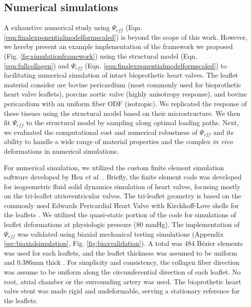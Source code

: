 \subsection{Numerical simulations}

	A exhaustive numerical study using $\Psi_{eff}$ (Eqn. \ref{eqn:finalexponentialmodelformscaled}) is beyond the scope of this work. However, we hereby present an example implementation of the framework we proposed (Fig. \ref{fig:simulationframework}) using the structural model (Eqn. \ref{eqn:fullcollagen}) and $\Psi_{eff}$ (Eqn. \ref{eqn:finalexponentialmodelformscaled}) to facilitating numerical simulation of intact bioprothetic heart valves. The leaflet material consider are bovine pericardium (most commonly used for bioprothetic heart valve leaflets), porcine aortic valve (highly anisotropy response), and bovine pericardium with an uniform fiber ODF (isotropic). We replicated the response of these tissues using the structural model based on their microstructure. We then fit $\Psi_{eff}$ to the structural model by sampling along optimal loading paths. Next, we evaluated the computational cost and numerical robustness of $\Psi_{eff}$ and its ability to handle a wide range of material properties and the complex \textit{in vivo} deformations in numerical simulations.
    
    
    For numerical simulation, we utilized the custom finite element simulation software developed by Hsu \textit{et al.} \cite{hsu_dynamic_2015, kamensky_immersogeometric_2015, kiendl_isogeometric_2015}. Briefly, the finite element code was developed for isogeometric fluid solid dynamics simulation of heart valves, focusing mostly on the tri-leaflet atrioventricular valves. The tri-leaflet geometry is based on the commonly used Edwards Pericardial Heart Valve with Kirchhoff-Love shells for the leaflets \cite{kiendl_isogeometric_2015}. We utilized the quasi-static portion of the code for simulations of leaflet deformations at physiologic pressure (80 mmHg). The implementation of $\Psi_{eff}$ was validated using biaxial mechanical testing simulations (Appendix \ref{sec:biaxialsimulation}, Fig. \ref{fig:biaxvalidation}). A total was 484 B\'ezier elements was used for each leaflets, and the leaflet thickness was assumed to be uniform and 0.386mm thick \cite{hsu_dynamic_2015}. For simplicity and consistency, the collagen fiber direction was assume to be uniform along the circumferential direction of each leaflet. No root, atrial chamber or the surrounding artery was used. The bioprothetic heart valve stent was made rigid and undeformable, serving a stationary reference for the leaflets. 

